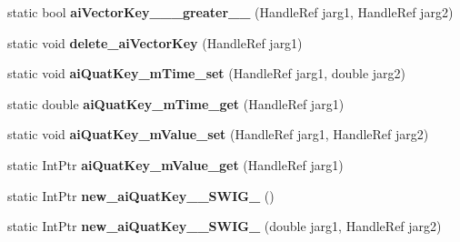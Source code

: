 \begin{DoxyCompactItemize}
\item 
\hypertarget{class_assimp_p_i_n_v_o_k_e_a9e0c1757ff8f239f96b7d4076f7279f3}{static bool {\bfseries ai\+Vector\+Key\+\_\+\+\_\+\+\_\+greater\+\_\+\+\_\+} (Handle\+Ref jarg1, Handle\+Ref jarg2)}\label{class_assimp_p_i_n_v_o_k_e_a9e0c1757ff8f239f96b7d4076f7279f3}

\item 
\hypertarget{class_assimp_p_i_n_v_o_k_e_acbd63845ef1c55248cb0aa1df41b86ab}{static void {\bfseries delete\+\_\+ai\+Vector\+Key} (Handle\+Ref jarg1)}\label{class_assimp_p_i_n_v_o_k_e_acbd63845ef1c55248cb0aa1df41b86ab}

\item 
\hypertarget{class_assimp_p_i_n_v_o_k_e_a01db54048fcfc9772551820bd07ab282}{static void {\bfseries ai\+Quat\+Key\+\_\+m\+Time\+\_\+set} (Handle\+Ref jarg1, double jarg2)}\label{class_assimp_p_i_n_v_o_k_e_a01db54048fcfc9772551820bd07ab282}

\item 
\hypertarget{class_assimp_p_i_n_v_o_k_e_a64574480dbb12a544db79b3d2e02f80a}{static double {\bfseries ai\+Quat\+Key\+\_\+m\+Time\+\_\+get} (Handle\+Ref jarg1)}\label{class_assimp_p_i_n_v_o_k_e_a64574480dbb12a544db79b3d2e02f80a}

\item 
\hypertarget{class_assimp_p_i_n_v_o_k_e_a70b64621156a3b7c768ced686f03a822}{static void {\bfseries ai\+Quat\+Key\+\_\+m\+Value\+\_\+set} (Handle\+Ref jarg1, Handle\+Ref jarg2)}\label{class_assimp_p_i_n_v_o_k_e_a70b64621156a3b7c768ced686f03a822}

\item 
\hypertarget{class_assimp_p_i_n_v_o_k_e_a45581b465d2a64fcbaacac9327d26f29}{static Int\+Ptr {\bfseries ai\+Quat\+Key\+\_\+m\+Value\+\_\+get} (Handle\+Ref jarg1)}\label{class_assimp_p_i_n_v_o_k_e_a45581b465d2a64fcbaacac9327d26f29}

\item 
\hypertarget{class_assimp_p_i_n_v_o_k_e_ae38a7fa0b6185c14ceca28b292d67788}{static Int\+Ptr {\bfseries new\+\_\+ai\+Quat\+Key\+\_\+\+\_\+\+S\+W\+I\+G\+\_} ()}\label{class_assimp_p_i_n_v_o_k_e_ae38a7fa0b6185c14ceca28b292d67788}

\item 
\hypertarget{class_assimp_p_i_n_v_o_k_e_a16c533bded616a231fa1d040e908ab52}{static Int\+Ptr {\bfseries new\+\_\+ai\+Quat\+Key\+\_\+\+\_\+\+S\+W\+I\+G\+\_} (double jarg1, Handle\+Ref jarg2)}\label{class_assimp_p_i_n_v_o_k_e_a16c533bded616a231fa1d040e908ab52}


\end{DoxyCompactItemize}
